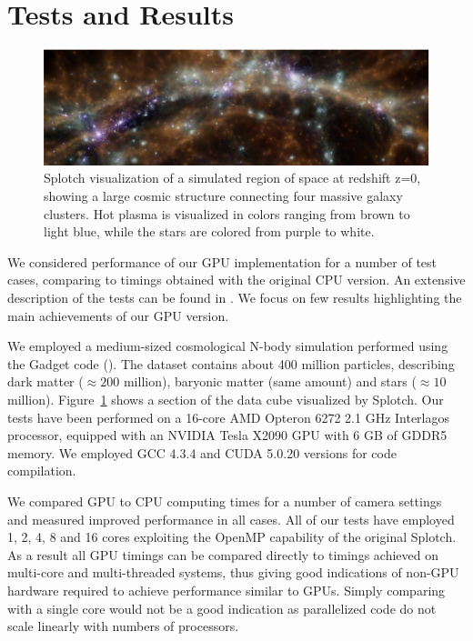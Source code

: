\section{Tests and Results}

\begin{figure}
\centering
\includegraphics[scale=1.0]{part4/Gheller_P013/P013-1.eps}
\caption{Splotch visualization of a simulated region of space at redshift z=0, showing a large cosmic structure connecting four massive galaxy clusters. Hot plasma is visualized in colors ranging from brown to light blue, while the stars are colored from purple to white.}

\label{fig:box}
\end{figure}

We considered performance of our GPU implementation for a number of test cases, comparing to timings obtained with the original CPU version. An extensive description of the tests can be found in \citet{cusplotch}. We focus on few results highlighting the main achievements of our GPU version.

We employed a medium-sized cosmological N-body simulation performed using the Gadget code (\citet{springel2005}). The dataset contains about 400 million particles, describing dark matter ($\approx 200$ million), baryonic matter (same amount) and stars ($\approx 10$ million). Figure~\ref{fig:box} shows a section of the data cube visualized by Splotch. Our tests have been performed on a 16-core AMD Opteron 6272 2.1 GHz Interlagos processor, equipped with an NVIDIA Tesla X2090 GPU with 6 GB of GDDR5 memory. We employed GCC 4.3.4 and CUDA 5.0.20 versions for code compilation.

We compared GPU to CPU computing times for a number of camera settings and measured improved performance in all cases. All of our tests have employed 1, 2, 4, 8 and 16 cores exploiting the OpenMP capability of the original Splotch. As a result all GPU timings can be compared directly to timings achieved on multi-core and multi-threaded systems, thus giving good indications of non-GPU hardware required to achieve performance similar to GPUs. Simply comparing with a single core would not be a good indication as parallelized code do not scale linearly with numbers of processors.

